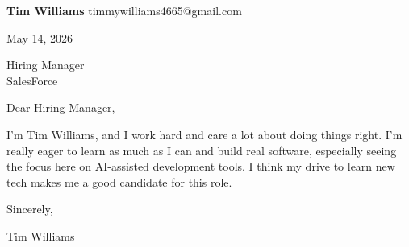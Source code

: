 \documentclass[12pt]{article}
\begin{document}
\textbf{Tim Williams} \hfill timmywilliams4665@gmail.com

\vspace{1em}

May 14, 2026

\vspace{1em}

Hiring Manager \\
SalesForce

\vspace{1em}

Dear Hiring Manager,

I'm Tim Williams, and I work hard and care a lot about doing things right. I'm really eager to learn as much as I can and build real software, especially seeing the focus here on AI-assisted development tools. I think my drive to learn new tech makes me a good candidate for this role.

\vspace{1em}

Sincerely,

\vspace{2em}

Tim Williams
\end{document}
